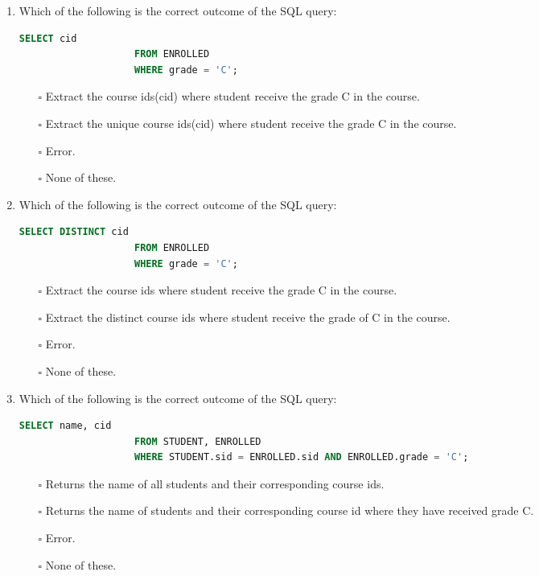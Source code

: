 \documentclass[10pt]{article}
\begin{document}
\begin{enumerate}
			\item Which of the following is the correct outcome of the SQL query: 
				\begin{lstlisting}[language=SQL,firstline=1, lastline=3]
					SELECT cid 
					FROM ENROLLED 
					WHERE grade = 'C';
				\end{lstlisting}

				\begin{enumerate}
					\item[$\square$] Extract the course ids(cid) where student receive the grade C in the course.
					\item[$\square$] Extract the unique course ids(cid) where student receive the grade C in the course.
					\item[$\square$] Error.
					\item[$\square$] None of these.
				\end{enumerate}

			\item Which of the following is the correct outcome of the SQL query: 
				\begin{lstlisting}[language=SQL,firstline=1, lastline=3]
					SELECT DISTINCT cid 
					FROM ENROLLED 
					WHERE grade = 'C';
				\end{lstlisting}

				\begin{enumerate}
					\item[$\square$] Extract the course ids where student receive the grade C in the course.
					\item[$\square$] Extract the distinct course ids where student receive the grade of C in the course.
					\item[$\square$] Error.
					\item[$\square$] None of these.
				\end{enumerate}
			
			\newpage

			\item Which of the following is the correct outcome of the SQL query: 
				\begin{lstlisting}[language=SQL,firstline=1, lastline=3]
					SELECT name, cid 
					FROM STUDENT, ENROLLED 
					WHERE STUDENT.sid = ENROLLED.sid AND ENROLLED.grade = 'C';
				\end{lstlisting}
			
				\begin{enumerate}
					\item[$\square$] Returns the name of all students and their corresponding course ids.
					\item[$\square$] Returns the name of students and their corresponding course id where they have received grade C.
					\item[$\square$] Error.
					\item[$\square$] None of these.
				\end{enumerate}


\end{enumerate}
\end{document}
